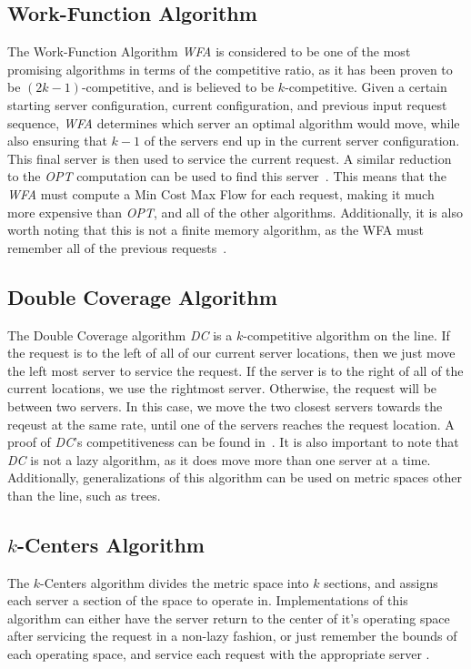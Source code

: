 \subsection*{Work-Function Algorithm}
\label{sec:WFA}
The Work-Function Algorithm \textit{WFA} is considered to be one of the most promising algorithms in terms of the competitive ratio, as it has been proven to be $(2k-1)$-competitive, and is believed to be $k$-competitive. Given a certain starting server configuration, current configuration, and previous input request sequence, \textit{WFA} determines which server an optimal algorithm would move, while also ensuring that $k-1$ of the servers end up in the current server configuration. This final server is then used to service the current request. A similar reduction to the \textit{OPT} computation can be used to find this server~\cite{WFA2009}. This means that the \textit{WFA} must compute a Min Cost Max Flow for each request, making it much more expensive than \textit{OPT}, and all of the other algorithms. Additionally, it is also worth noting that this is not a finite memory algorithm, as the WFA must remember all of the previous requests~\cite{MAXMAX2005}. 

\subsection*{Double Coverage Algorithm}
\label{sec:DC}
The Double Coverage algorithm \textit{DC} is a $k$-competitive algorithm on the line. If the request is to the left of all of our current server locations, then we just move the left most server to service the request. If the server is to the right of all of the current locations, we use the rightmost server. Otherwise, the request will be between two servers. In this case, we move the two closest servers towards the reqeust at the same rate, until one of the servers reaches the request location. A proof of \textit{DC}'s competitiveness can be found in~\cite{OnlineComp1998}. It is also important to note that \textit{DC} is not a lazy algorithm, as it does move more than one server at a time. Additionally, generalizations of this algorithm can be used on metric spaces other than the line, such as trees.

\subsection*{$k$-Centers Algorithm}
\label{sec:KC}
The $k$-Centers algorithm divides the metric space into $k$ sections, and assigns each server a section of the space to operate in. Implementations of this algorithm can either have the server return to the center of it's operating space after servicing the request in a non-lazy fashion, or just remember the bounds of each operating space, and service each request with the appropriate server .
